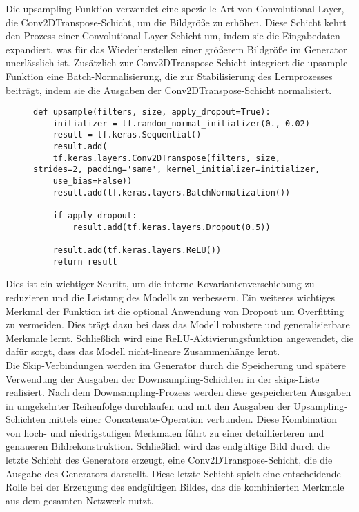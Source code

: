Die upsampling-Funktion verwendet eine spezielle Art von Convolutional Layer, die Conv2DTranspose-Schicht, um die Bildgröße zu erhöhen. Diese Schicht kehrt den Prozess einer Convolutional Layer Schicht um, indem sie die Eingabedaten expandiert, was für das Wiederherstellen einer größerem Bildgröße im Generator unerlässlich ist. Zusätzlich zur Conv2DTranspose-Schicht integriert die upsample-Funktion eine Batch-Normalisierung, die zur Stabilisierung des Lernprozesses beiträgt, indem sie die Ausgaben der Conv2DTranspose-Schicht normalisiert. 
\begin{figure}[H]
	\centering
\begin{lstlisting}[language=pyhaff, caption={Upsampling-Schritt in Pix2Pix}, label={cod:Pix2PixGAN Generator}]
def upsample(filters, size, apply_dropout=True):
	initializer = tf.random_normal_initializer(0., 0.02)
	result = tf.keras.Sequential()
	result.add(
	tf.keras.layers.Conv2DTranspose(filters, size, strides=2, padding='same', kernel_initializer=initializer, 
	use_bias=False))
	result.add(tf.keras.layers.BatchNormalization())
	
	if apply_dropout:
		result.add(tf.keras.layers.Dropout(0.5))
	
	result.add(tf.keras.layers.ReLU())
	return result
\end{lstlisting} 
\end{figure}
Dies ist ein wichtiger Schritt, um die interne Kovariantenverschiebung zu reduzieren und die Leistung des Modells zu verbessern. Ein weiteres wichtiges Merkmal der Funktion ist die optional Anwendung von Dropout um Overfitting zu vermeiden. Dies trägt dazu bei dass das Modell robustere und generalisierbare Merkmale lernt. Schließlich wird eine ReLU-Aktivierungsfunktion angewendet, die dafür sorgt, dass das Modell nicht-lineare Zusammenhänge lernt. 
\\\newline
Die Skip-Verbindungen werden im Generator durch die Speicherung und spätere Verwendung der Ausgaben der Downsampling-Schichten in der skips-Liste realisiert. Nach dem Downsampling-Prozess werden diese gespeicherten Ausgaben in umgekehrter Reihenfolge durchlaufen und mit den Ausgaben der Upsampling-Schichten mittels einer Concatenate-Operation verbunden. Diese Kombination von hoch- und niedrigstufigen Merkmalen führt zu einer detaillierteren und genaueren Bildrekonstruktion.
\newline
Schließlich wird das endgültige Bild durch die letzte Schicht des Generators erzeugt, eine Conv2DTranspose-Schicht, die die Ausgabe des Generators darstellt. Diese letzte Schicht spielt eine entscheidende Rolle bei der Erzeugung des endgültigen Bildes, das die kombinierten Merkmale aus dem gesamten Netzwerk nutzt.

